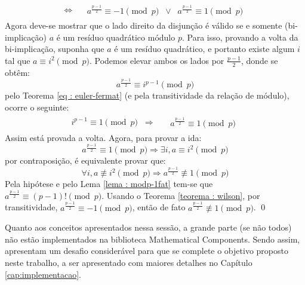 \begin{enumerate}
\begin{align*}
        \Longleftrightarrow
        &\begin{aligned}
            \;\; a^{\frac{p-1}{2}} \equiv -1 \pmod p \;\; \lor \;\; a^{\frac{p-1}{2}} \equiv 1 \pmod p
        \end{aligned}
\end{align*}
Agora deve-se mostrar que o lado direito da disjunção é válido se e somente (bi-implicação) $a$ é um resíduo quadrático módulo $p$. Para isso, provando a volta da bi-implicação, suponha que $a$ é um resíduo quadrático, e portanto existe algum $i$ tal que
$a \equiv i^2 \pmod p$. Podemos elevar ambos os lados por $\frac{p-1}{2}$, donde se obtêm:
\begin{equation*}
    a^{\frac{p-1}{2}} \equiv i^{p-1} \pmod p
\end{equation*}
pelo Teorema \ref{eq : euler-fermat} (e pela transitividade da relação de módulo), ocorre o seguinte:
\begin{align*}
    i^{p-1} \equiv 1 \pmod p \;\; \Longrightarrow
    &\begin{aligned}
        \;\; a^{\frac{p-1}{2}} \equiv 1 \pmod p
    \end{aligned}
\end{align*}
Assim está provada a volta. Agora, para provar a ida:
\begin{equation*}
    a^{\frac{p-1}{2}} \equiv 1 \pmod p \Longrightarrow \exists i, a \equiv i^2 \pmod p 
\end{equation*}
por contraposição, é equivalente provar que:
\begin{equation} \label{eq : contrapos}
    \forall i, a \not\equiv i^2  \pmod p \Longrightarrow a^{\frac{p-1}{2}} \not\equiv 1 \pmod p
\end{equation}
Pela hipótese e pelo Lema \ref{lema : modp-1fat} tem-se que $a^{\frac{p-1}{2}} \equiv (p-1)! \pmod{p}$. Usando o Teorema \ref{teorema : wilson}, por transitividade, $a^{\frac{p-1}{2}} \equiv -1 \pmod{p}$, então de fato $a^{\frac{p-1}{2}} \not\equiv 1 \pmod{p}$. \qed

\end{enumerate}

Quanto aos conceitos apresentados nessa sessão, a grande parte (se não todos) não estão implementados na biblioteca Mathematical Components. Sendo assim, apresentam um desafio considerável para que se complete o objetivo proposto neste trabalho, a ser apresentado com maiores detalhes no Capítulo \ref{cap:implementacao}.